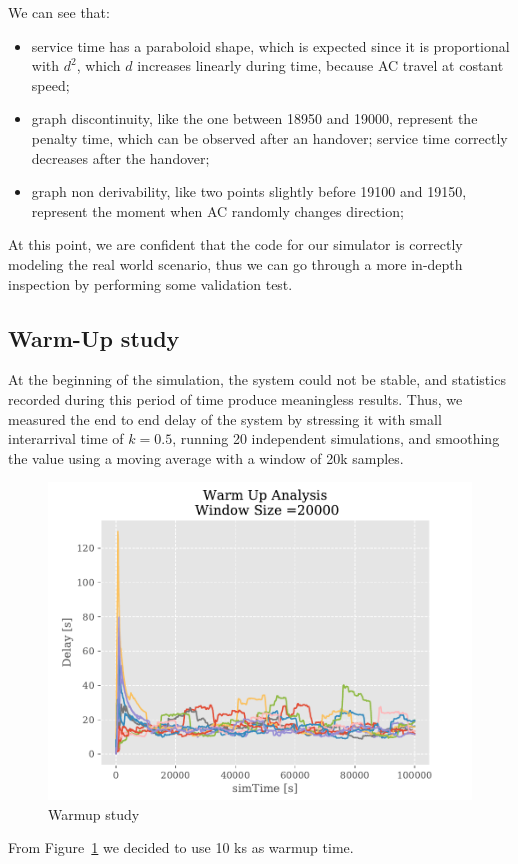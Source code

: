 \documentclass[a4paper,12pt]{article}
\begin{document}
We can see that:
\begin{itemize}
  \item service time has a paraboloid shape, which is expected since it is proportional with $d^2$, which $d$ increases linearly during time, because AC travel at costant speed;
  \item graph discontinuity, like the one between 18950 and 19000, represent the penalty time, which can be observed after an handover; service time correctly decreases after the handover;
  \item graph non derivability, like two points slightly before 19100 and 19150, represent the moment when AC randomly changes direction;
\end{itemize}

At this point, we are confident that the code for our simulator is correctly modeling the real world scenario, thus we can go through a more in-depth inspection by performing some validation test.

\subsection{Warm-Up study}
At the beginning of the simulation, the system could not be stable, and statistics recorded during this period of time produce meaningless results.
Thus, we measured the end to end delay of the system by stressing it with small interarrival time of $k=0.5$, running 20 independent simulations, and smoothing the value using a moving average with a window of 20k samples.

\begin{figure}[H]
  \centering
  \includegraphics[width=.6\textwidth]{img/warmup-study.pdf}
  \caption{Warmup study}
  \label{fig:warmup-study}
\end{figure}

From Figure~\ref{fig:warmup-study} we decided to use 10 ks as warmup time.
\end{document}
